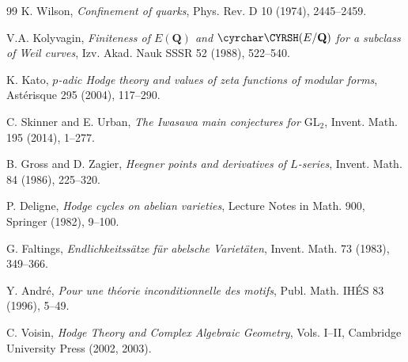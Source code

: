 \documentclass[11pt]{article}
\begin{document}
\begin{thebibliography}{99}
K. Wilson, \emph{Confinement of quarks},
Phys. Rev. D 10 (1974), 2445--2459.

V.A. Kolyvagin, \emph{Finiteness of $E(\mathbf{Q})$ and
$\text{\cyrchar\CYRSH}(E/\mathbf{Q})$ for a subclass of Weil curves},
Izv. Akad. Nauk SSSR 52 (1988), 522--540.

K. Kato, \emph{$p$-adic Hodge theory and values of zeta functions of
modular forms}, Ast\'erisque 295 (2004), 117--290.

C. Skinner and E. Urban, \emph{The Iwasawa main conjectures for
$\mathrm{GL}_2$}, Invent. Math. 195 (2014), 1--277.

B. Gross and D. Zagier, \emph{Heegner points and derivatives of
$L$-series}, Invent. Math. 84 (1986), 225--320.

P. Deligne, \emph{Hodge cycles on abelian varieties},
Lecture Notes in Math. 900, Springer (1982), 9--100.

G. Faltings, \emph{Endlichkeitss\"atze f\"ur abelsche Variet\"aten},
Invent. Math. 73 (1983), 349--366.

Y. Andr\'e, \emph{Pour une th\'eorie inconditionnelle des motifs},
Publ. Math. IH\'ES 83 (1996), 5--49.

C. Voisin, \emph{Hodge Theory and Complex Algebraic Geometry},
Vols. I--II, Cambridge University Press (2002, 2003).

\end{thebibliography}
\end{document}
